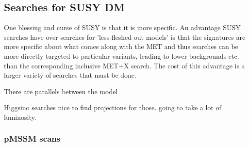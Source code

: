 


%

\subsection{Searches for SUSY DM}
\label{sec:results_SUSYSearches}


One blessing and curse of SUSY is that it is more specific.
An advantage SUSY searches have over searches for 'less-fleshed-out models' is that the signatures are more specific about what comes along with the MET and thus searches can be more directly targeted to particular variants, leading to lower backgrounds etc. than the corresponding inclusive MET+X search. The cost of this advantage is a larger variety of searches that must be done.

There are parallels between the model 
 


Higgsino searches nice to find projections for those. going to take a lot of luminosity.


\subsubsection{pMSSM scans}


